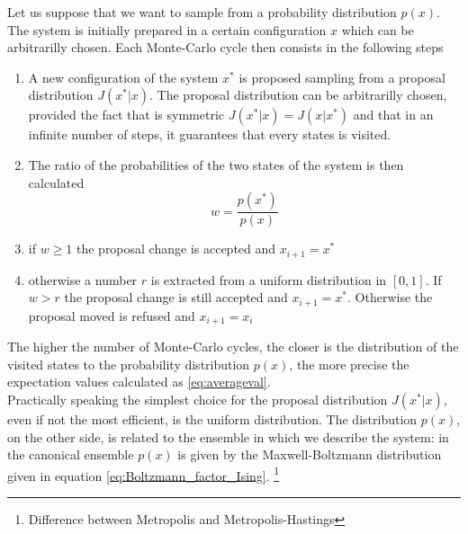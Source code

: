 Let us suppose that we want to sample from a probability distribution $p(x)$. \\
The system is initially prepared in a certain configuration $x$ which can be arbitrarilly chosen. Each Monte-Carlo cycle then consists in the following steps
\begin{enumerate}
    \item A new configuration of the system $x^*$ is proposed sampling from a proposal distribution $J(x^*|x)$. The proposal distribution can be arbitrarilly chosen, provided the fact that is symmetric $J(x^*|x) = J(x|x^*)$ and that in an infinite number of steps, it guarantees that 
    every states is visited.
    \item The ratio of the probabilities of the two states of the system is then calculated
    \begin{equation*}
        w = \frac{p(x^*)}{p(x)}
    \end{equation*}
    \item if $w \geq 1$ the proposal change is accepted and $x_{i+1} = x^*$
    \item otherwise a number $r$ is extracted from a uniform distribution in $[0,1]$. If $w > r$ the proposal change is still accepted and $x_{i+1} = x^*$. Otherwise the proposal moved is refused and $x_{i+1} = x_i$
\end{enumerate}
The higher the number of Monte-Carlo cycles, the closer is the distribution of the visited states to the probability distribution $p(x)$, the more precise the expectation values calculated as \ref{eq:averageval}. \\
Practically speaking the simplest choice for the proposal distribution $J(x^*|x)$, even if not the most efficient, is the uniform distribution. The distribution $p(x)$, on the other side, is related to the ensemble 
in which we describe the system: in the canonical ensemble $p(x)$ is given by the Maxwell-Boltzmann distribution given in equation \ref{eq:Boltzmann_factor_Ising}.
\footnote{Difference between Metropolis and Metropolis-Hastings}

